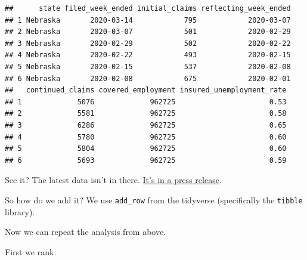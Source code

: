 \documentclass[]{book}
\newenvironment{Shaded}{\begin{snugshade}}{\end{snugshade}}
\newcommand{\DataTypeTok}[1]{\textcolor[rgb]{0.13,0.29,0.53}{#1}}
\newcommand{\DecValTok}[1]{\textcolor[rgb]{0.00,0.00,0.81}{#1}}
\newcommand{\KeywordTok}[1]{\textcolor[rgb]{0.13,0.29,0.53}{\textbf{#1}}}
\newcommand{\NormalTok}[1]{#1}
\newcommand{\OperatorTok}[1]{\textcolor[rgb]{0.81,0.36,0.00}{\textbf{#1}}}
\newcommand{\StringTok}[1]{\textcolor[rgb]{0.31,0.60,0.02}{#1}}
\begin{document}
\begin{verbatim}
##      state filed_week_ended initial_claims reflecting_week_ended
## 1 Nebraska       2020-03-14            795            2020-03-07
## 2 Nebraska       2020-03-07            501            2020-02-29
## 3 Nebraska       2020-02-29            502            2020-02-22
## 4 Nebraska       2020-02-22            493            2020-02-15
## 5 Nebraska       2020-02-15            537            2020-02-08
## 6 Nebraska       2020-02-08            675            2020-02-01
##   continued_claims covered_employment insured_unemployment_rate
## 1             5076             962725                      0.53
## 2             5581             962725                      0.58
## 3             6286             962725                      0.65
## 4             5780             962725                      0.60
## 5             5804             962725                      0.60
## 6             5693             962725                      0.59
\end{verbatim}

See it? The latest data isn't in there. \href{https://www.dol.gov/sites/dolgov/files/OPA/newsreleases/ui-claims/20200510.pdf}{It's in a press release}.

So how do we add it? We use \texttt{add\_row} from the tidyverse (specifically the \texttt{tibble} library).

\begin{Shaded}
\end{Shaded}

Now we can repeat the analysis from above.

First we rank.

\begin{Shaded}
\end{Shaded}
\end{document}
